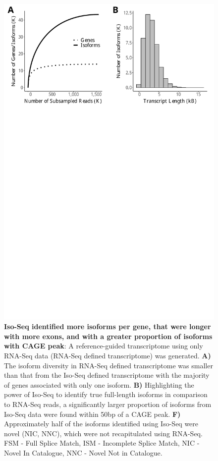 \begin{figure}[htp]
	\begin{center}
		\includegraphics[page=9,trim={0 13cm 0 0},scale = 0.55]{Figures/IsoSeqWholeTranscriptome.pdf}
	\end{center}
	\captionsetup{width=0.95\textwidth}
	\caption[RNA-Seq defined transcriptome]%
	{\textbf{Iso-Seq identified more isoforms per gene, that were longer with more exons, and with a greater proportion of isoforms with CAGE peak}: A reference-guided transcriptome using only RNA-Seq data (RNA-Seq defined transcriptome) was generated. \textbf{A)} The isoform diversity in RNA-Seq defined transcriptome was smaller than that from the Iso-Seq defined transcriptome with the majority of genes associated with only one isoform. \textbf{B)} Highlighting the power of Iso-Seq to identify true full-length isoforms in comparison to RNA-Seq reads, a significantly larger proportion of isoforms from Iso-Seq data were found within 50bp of a CAGE peak. \textbf{F)} Approximately half of the isoforms identified using Iso-Seq were novel (NIC, NNC), which were not recapitulated using RNA-Seq. FSM - Full Splice Match, ISM - Incomplete Splice Match, NIC - Novel In Catalogue, NNC - Novel Not in Catalogue.}   
	\label{fig:isoseq_whole_rnaseqvsisoseq}
\end{figure}

